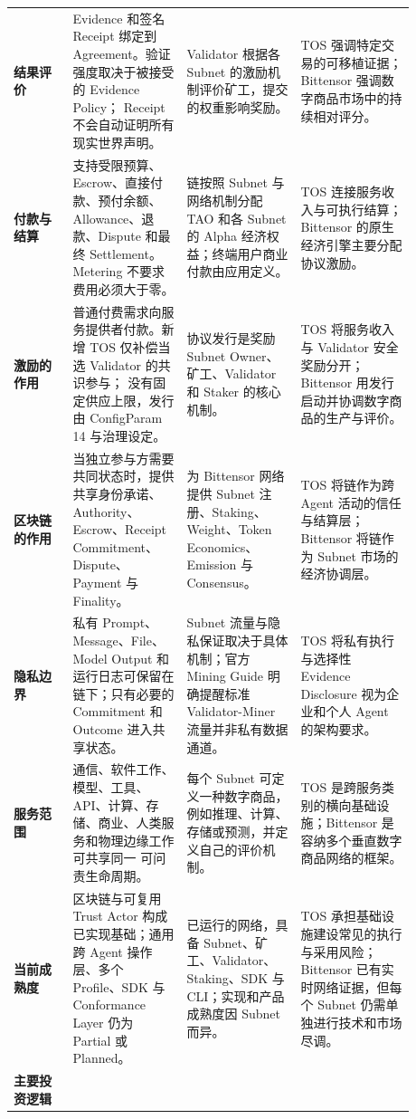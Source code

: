 \documentclass[UTF8,11pt,fontset=fandol]{ctexart}
\begin{document}
\begin{landscape}
\begin{longtable}{P{0.13\linewidth}P{0.25\linewidth}P{0.25\linewidth}P{0.25\linewidth}}
\textbf{结果评价} &
Evidence 和签名 Receipt 绑定到 Agreement。验证强度取决于被接受的 Evidence Policy；
Receipt 不会自动证明所有现实世界声明。 &
Validator 根据各 Subnet 的激励机制评价矿工，提交的权重影响奖励。 &
TOS 强调特定交易的可移植证据；Bittensor 强调数字商品市场中的持续相对评分。 \\
\textbf{付款与结算} &
支持受限预算、Escrow、直接付款、预付余额、Allowance、退款、Dispute 和最终 Settlement。
Metering 不要求费用必须大于零。 &
链按照 Subnet 与网络机制分配 TAO 和各 Subnet 的 Alpha 经济权益；终端用户商业付款由应用定义。 &
TOS 连接服务收入与可执行结算；Bittensor 的原生经济引擎主要分配协议激励。 \\
\textbf{激励的作用} &
普通付费需求向服务提供者付款。新增 TOS 仅补偿当选 Validator 的共识参与；
没有固定供应上限，发行由 ConfigParam 14 与治理设定。 &
协议发行是奖励 Subnet Owner、矿工、Validator 和 Staker 的核心机制。 &
TOS 将服务收入与 Validator 安全奖励分开；Bittensor 用发行启动并协调数字商品的生产与评价。 \\
\textbf{区块链的作用} &
当独立参与方需要共同状态时，提供共享身份承诺、Authority、Escrow、Receipt Commitment、
Dispute、Payment 与 Finality。 &
为 Bittensor 网络提供 Subnet 注册、Staking、Weight、Token Economics、Emission 与 Consensus。 &
TOS 将链作为跨 Agent 活动的信任与结算层；Bittensor 将链作为 Subnet 市场的经济协调层。 \\
\textbf{隐私边界} &
私有 Prompt、Message、File、Model Output 和运行日志可保留在链下；只有必要的 Commitment
和 Outcome 进入共享状态。 &
Subnet 流量与隐私保证取决于具体机制；官方 Mining Guide 明确提醒标准 Validator-Miner
流量并非私有数据通道。 &
TOS 将私有执行与选择性 Evidence Disclosure 视为企业和个人 Agent 的架构要求。 \\
\textbf{服务范围} &
通信、软件工作、模型、工具、API、计算、存储、商业、人类服务和物理边缘工作可共享同一
可问责生命周期。 &
每个 Subnet 可定义一种数字商品，例如推理、计算、存储或预测，并定义自己的评价机制。 &
TOS 是跨服务类别的横向基础设施；Bittensor 是容纳多个垂直数字商品网络的框架。 \\
\textbf{当前成熟度} &
区块链与可复用 Trust Actor 构成已实现基础；通用跨 Agent 操作层、多个 Profile、SDK 与
Conformance Layer 仍为 Partial 或 Planned。 &
已运行的网络，具备 Subnet、矿工、Validator、Staking、SDK 与 CLI；实现和产品成熟度因
Subnet 而异。 &
TOS 承担基础设施建设常见的执行与采用风险；Bittensor 已有实时网络证据，但每个 Subnet
仍需单独进行技术和市场尽调。 \\
\textbf{主要投资逻辑} &

\end{longtable}
\end{landscape}
\end{document}
